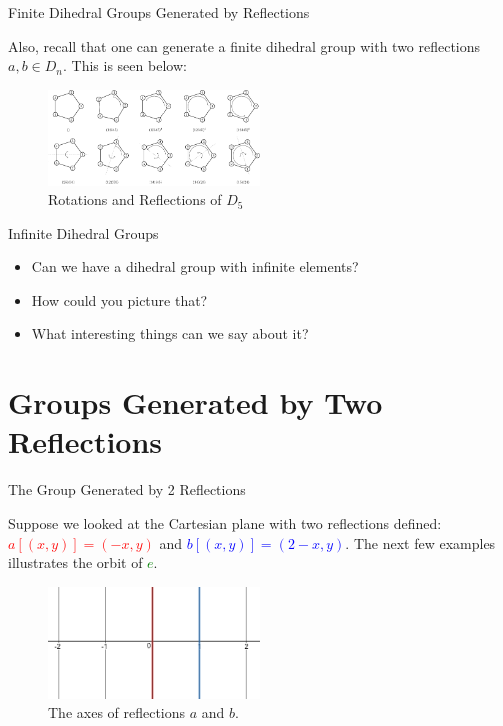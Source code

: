 \documentclass[usenames,dvipsnames]{beamer}
\begin{document}
\begin{frame}{Finite Dihedral Groups Generated by Reflections}

Also, recall that one can generate a finite dihedral group with two reflections $a,b\in D_n$. This is seen
below:

\pause{}

\begin{figure}[h]
    \centering
    \includegraphics[width=0.50\textwidth]{images/d5_rotations_reflections.png}
    \caption{Rotations and Reflections of $D_5$}
\end{figure}

\end{frame}

\begin{frame}{Infinite Dihedral Groups}

\begin{itemize}
  \item Can we have a dihedral group with infinite elements?
  \pause{}
  \item How could you picture that?
  \pause{}
  \item What interesting things can we say about it?
\end{itemize}

\end{frame}


\section{Groups Generated by Two Reflections}

\begin{frame}{The Group Generated by 2 Reflections}

Suppose we looked at the Cartesian plane with two reflections defined: \textcolor{red}{$a[(x,y)]=(-x,y)$}
and \textcolor{blue}{$b[(x,y)]=(2-x,y)$}. The next few examples illustrates the orbit of
\textcolor{green}{$e$}.

\begin{figure}[h]
    \centering
    \includegraphics[width=0.50\textwidth]{images/1-01-d_inf.png}
    \caption{The axes of reflections $a$ and $b$.}
\end{figure}

\end{frame}
\end{document}
